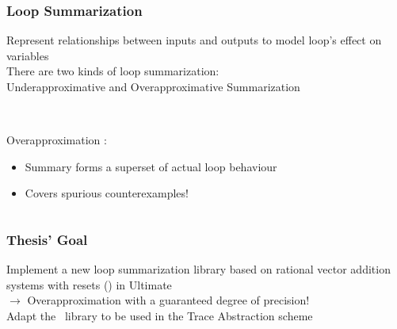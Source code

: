 \begin{frame}[t]
	\frametitle{Loop Summarization}
	\begin{center}
		Represent relationships between inputs and outputs to model loop's effect on variables \\ \vspace*{0.25cm}
		There are two kinds of loop summarization: \\
		\onslide<+-> \color{emblue}Underapproximative \color{black} and \color{emblue}Overapproximative \color{black} Summarization
		\begin{columns}[t]
			\begin{column}{0.35\textwidth}
				\vspace*{0.5cm} \\
				\onslide<+-> \color{emblue} Overapproximation \color{black}:
				\begin{itemize}
					\onslide<+-> \item Summary forms a superset of actual loop behaviour
					\onslide<+-> \item Covers spurious counterexamples!
				\end{itemize}
			\end{column}
			\begin{column}{0.5\textwidth}
				\vspace*{0.5cm}
				\resizebox{\textwidth}{!}{}
			\end{column}
		\end{columns}
	\end{center}
\end{frame}

\begin{frame}[t]
	\frametitle{Thesis' Goal}
	\begin{center}
		Implement a new loop summarization library based on rational vector addition systems with resets (\qvasr) in Ultimate \\
		\onslide<+-> $\rightarrow$ Overapproximation with a \color{red} guaranteed \color{black} degree of precision! \\\vspace*{1cm}
		\onslide<+-> Adapt the \qvasr\ library to be used in the Trace Abstraction scheme
	\end{center}
\end{frame}